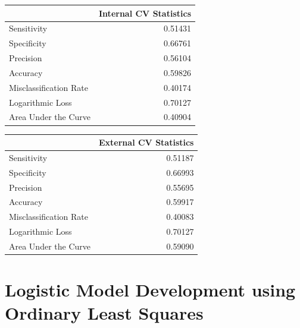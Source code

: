 \documentclass[american,]{article}
\begin{document}
\pagebreak
\begin{table}

\centering
\begin{tabular}{lr}
\toprule
  & Internal CV Statistics\\
\midrule
Sensitivity & 0.51431\\
Specificity & 0.66761\\
Precision & 0.56104\\
Accuracy & 0.59826\\
Misclassification Rate & 0.40174\\
\addlinespace
Logarithmic Loss & 0.70127\\
Area Under the Curve & 0.40904\\
\bottomrule
\end{tabular}
\centering
\begin{tabular}{lr}
\toprule
  & External CV Statistics\\
\midrule
Sensitivity & 0.51187\\
Specificity & 0.66993\\
Precision & 0.55695\\
Accuracy & 0.59917\\
Misclassification Rate & 0.40083\\
\addlinespace
Logarithmic Loss & 0.70127\\
Area Under the Curve & 0.59090\\
\bottomrule
\end{tabular}
\end{table}

\hypertarget{logistic-model-development-using-ordinary-least-squares}{%
\section{\texorpdfstring{\textbf{Logistic Model Development using Ordinary Least Squares}}{Logistic Model Development using Ordinary Least Squares}}\label{logistic-model-development-using-ordinary-least-squares}}
\end{document}
